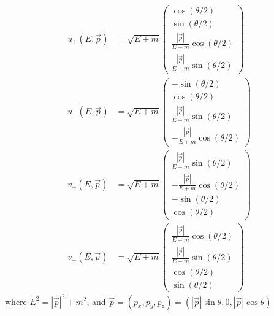 \documentclass[a4paper,11pt]{article}
\numberwithin{equation}{section} %
\begin{document}
\begin{align}
u_+(E, \overrightarrow{p}) &= \sqrt{E+m} \begin{pmatrix} \cos{(\theta/2)} \\  \sin{(\theta/2)} \\ \frac{|\overrightarrow{p}|}{E+m} \cos{(\theta/2)} \\ \frac{|\overrightarrow{p}|}{E+m}  \sin{(\theta/2)} \end{pmatrix}
\\
u_-(E, \overrightarrow{p}) &= \sqrt{E+m} \begin{pmatrix} -\sin{(\theta/2)} \\  \cos{(\theta/2)} \\ \frac{|\overrightarrow{p}|}{E+m} \sin{(\theta/2)} \\ -\frac{|\overrightarrow{p}|}{E+m}  \cos{(\theta/2)} \end{pmatrix}
\\
v_+(E, \overrightarrow{p}) &= \sqrt{E+m} \begin{pmatrix} \frac{|\overrightarrow{p}|}{E+m} \sin{(\theta/2)} \\ -\frac{|\overrightarrow{p}|}{E+m}  \cos{(\theta/2)} \\ -\sin{(\theta/2)} \\  \cos{(\theta/2)} \end{pmatrix}
\\
v_-(E, \overrightarrow{p}) &= \sqrt{E+m} \begin{pmatrix}  \frac{|\overrightarrow{p}|}{E+m} \cos{(\theta/2)} \\ \frac{|\overrightarrow{p}|}{E+m}  \sin{(\theta/2)} \\ \cos{(\theta/2)} \\  \sin{(\theta/2)} \end{pmatrix}
\end{align}
where $E^2 = |\overrightarrow{p}|^2 + m^2$, and $\overrightarrow{p} = (p_x, p_y, p_z) = (|\overrightarrow{p}| \sin \theta, 0, |\overrightarrow{p}| \cos \theta)$
\end{document}
